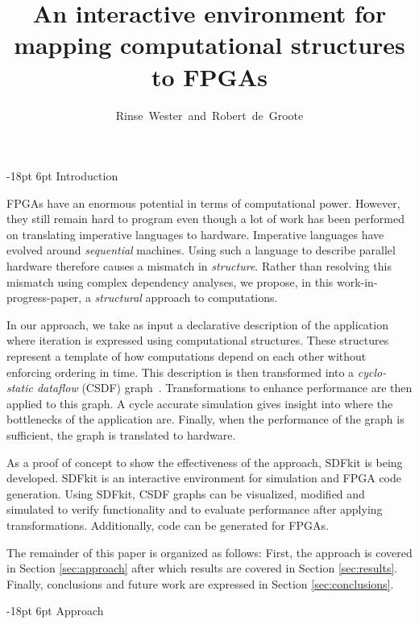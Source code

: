 \makeatother\documentclass[10pt,english,oneside,twocolumn,a4paper]{article}%
\title{An interactive environment for mapping computational structures to FPGAs}
\author{Rinse~Wester~and~Robert~de~Groote}
\affil{\\Computer Architecture for Embedded Systems,\\University of Twente\\ \{r.wester, robert.degroote\}@utwente.nl}
\makeatletter
\renewcommand\section{\@startsection {section}{1}{\z@}%
                                   {-18pt}%
                                   {6pt}%
                                   {\Large\bfseries\RaggedRight}}
\makeatother
\begin{document}
\maketitle

\section{Introduction}
  
  FPGAs have an enormous potential in terms of computational power.
  However, they still remain hard to program even though a lot of work has been performed on translating imperative languages to hardware.
  Imperative languages have evolved around \emph{sequential} machines.
  Using such a language to describe parallel hardware therefore causes a mismatch in \emph{structure}.
  Rather than resolving this mismatch using complex dependency analyses, we propose, in this work-in-progress-paper, a \emph{structural} approach to computations.

  In our approach, we take as input a declarative description of the application where iteration is expressed using computational structures.
  These structures represent a template of how computations depend on each other without enforcing ordering in time.
  This description is then transformed into a \emph{cyclo-static dataflow} (CSDF) graph~\cite{bilsen1996}.
  Transformations to enhance performance are then applied to this graph.
  A cycle accurate simulation gives insight into where the bottlenecks of the application are.
  Finally, when the performance of the graph is sufficient, the graph is translated to hardware.

  As a proof of concept to show the effectiveness of the approach, SDFkit is being developed.
  SDFkit is an interactive environment for simulation and FPGA code generation.
  Using SDFkit, CSDF graphs can be visualized, modified and simulated to verify functionality and to evaluate performance after applying transformations.
  Additionally, code can be generated for FPGAs.

  The remainder of this paper is organized as follows:
  First, the approach is covered in Section \ref{sec:approach} after which results are covered in Section \ref{sec:results}.
  Finally, conclusions and future work are expressed in Section \ref{sec:conclusions}.

\section{Approach}
\label{sec:approach}
\end{document}
